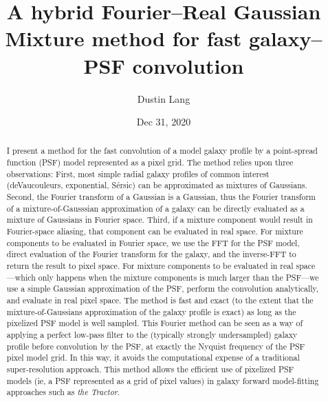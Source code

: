 \documentclass[11pt,letterpaper]{aastex63}
\newcommand{\project}[1]{\textsl{#1}}
\newcommand{\sersic}{S\'ersic}
\begin{document}
\title{A hybrid Fourier--Real Gaussian Mixture method for fast galaxy--PSF convolution}
\author{Dustin Lang} %
\date{Dec 31, 2020}

\begin{abstract}
  I present a method for the fast convolution of a model galaxy
  profile by a point-spread function (PSF) model represented as a pixel grid.
  The method relies upon three
  observations: First, most simple radial galaxy profiles of common interest
  (deVaucouleurs, exponential, \sersic) can be approximated as
  mixtures of Gaussians.  Second, the Fourier transform of a Gaussian
  is a Gaussian, thus the Fourier transform of a mixture-of-Gausssian
  approximation of a galaxy can be directly evaluated as a mixture of Gaussians
  in Fourier space.
  Third, if a mixture component would result in Fourier-space aliasing, that
  component can be evaluated in real space.
  For mixture components to be evaluated in Fourier space, we
  use the FFT for the PSF model, direct evaluation of the Fourier
  transform for the galaxy, and the inverse-FFT to return the result to
  pixel space.
  For mixture components to be evaluated in real space---which only happens when the mixture
  components is much larger than the PSF---we use a simple Gaussian approximation of
  the PSF, perform the convolution analytically, and evaluate in real pixel space.
  The method is fast and exact (to the extent that the mixture-of-Gaussians
  approximation of the galaxy profile is exact) as long as the pixelized PSF
  model is well sampled.
  This Fourier method can be seen as a way of applying a perfect low-pass filter to
  the (typically strongly undersampled) galaxy profile before convolution by
  the PSF, at exactly the Nyquist frequency of the PSF pixel model grid.  In
  this way, it avoids the computational expense of a traditional super-resolution
  approach.
  This method allows
  the efficient use of pixelized PSF models (ie, a PSF represented as
  a grid of pixel values) in galaxy forward model-fitting approaches such as
  \project{the Tractor}.
\end{abstract}
\end{document}
